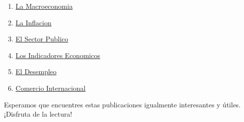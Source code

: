 \documentclass[
  jou,
  floatsintext,
  longtable,
  a4paper,
  nolmodern,
  notxfonts,
  notimes,
  colorlinks=true,linkcolor=blue,citecolor=blue,urlcolor=blue]{apa7}
\begin{document}
\begin{enumerate}
{  Financiero}
\item
  \href{https://achalmaedison.netlify.app/teching/economia-preuniversitaria/2014-02-25-la-macroeconomia/index.pdf}{}
  \href{https://achalmaedison.netlify.app/teching/economia-preuniversitaria/2014-02-25-la-macroeconomia}{La
  Macroeconomia}
\item
  \href{https://achalmaedison.netlify.app/teching/economia-preuniversitaria/2014-03-01-la-inflacion/index.pdf}{}
  \href{https://achalmaedison.netlify.app/teching/economia-preuniversitaria/2014-03-01-la-inflacion}{La
  Inflacion}
\item
  \href{https://achalmaedison.netlify.app/teching/economia-preuniversitaria/2014-03-08-el-sector-publico/index.pdf}{}
  \href{https://achalmaedison.netlify.app/teching/economia-preuniversitaria/2014-03-08-el-sector-publico}{El
  Sector Publico}
\item
  \href{https://achalmaedison.netlify.app/teching/economia-preuniversitaria/2014-03-15-los-indicadores-economicos/index.pdf}{}
  \href{https://achalmaedison.netlify.app/teching/economia-preuniversitaria/2014-03-15-los-indicadores-economicos}{Los
  Indicadores Economicos}
\item
  \href{https://achalmaedison.netlify.app/teching/economia-preuniversitaria/2014-03-22-el-desempleo/index.pdf}{}
  \href{https://achalmaedison.netlify.app/teching/economia-preuniversitaria/2014-03-22-el-desempleo}{El
  Desempleo}
\item
  \href{https://achalmaedison.netlify.app/teching/economia-preuniversitaria/2014-03-29-comercio-internacional/index.pdf}{}
  \href{https://achalmaedison.netlify.app/teching/economia-preuniversitaria/2014-03-29-comercio-internacional}{Comercio
  Internacional}
\end{enumerate}

Esperamos que encuentres estas publicaciones igualmente interesantes y
útiles. ¡Disfruta de la lectura!
\end{document}
